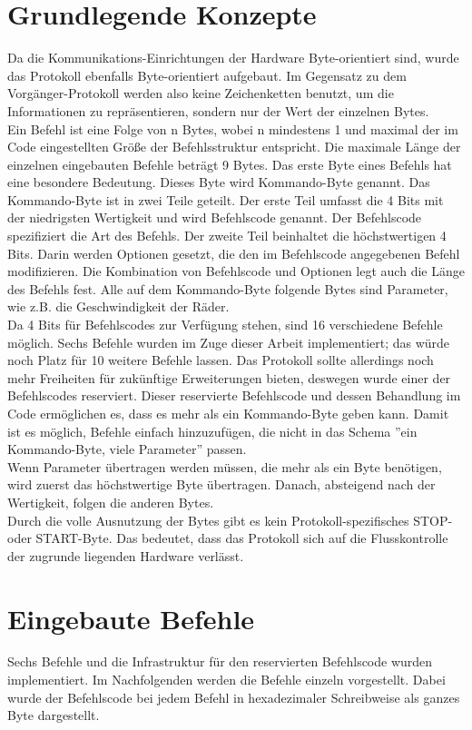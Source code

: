 \section{Grundlegende Konzepte}
Da die Kommunikations-Einrichtungen der Hardware Byte-orientiert sind, wurde das
Protokoll ebenfalls Byte-orientiert aufgebaut. Im Gegensatz zu dem Vorgänger-Protokoll
werden also keine Zeichenketten benutzt, um die Informationen zu repräsentieren, sondern
nur der Wert der einzelnen Bytes.\\
Ein Befehl ist eine Folge von n Bytes, wobei n mindestens 1 und maximal der im Code
eingestellten Größe der Befehlsstruktur entspricht. 
Die maximale Länge der einzelnen eingebauten Befehle beträgt 9 Bytes.
Das erste Byte eines Befehls hat eine
besondere Bedeutung. Dieses Byte wird Kommando-Byte genannt. Das Kommando-Byte
ist in zwei Teile geteilt. Der erste Teil umfasst die 4 Bits mit der niedrigsten Wertigkeit und
wird Befehlscode genannt. Der Befehlscode spezifiziert die Art des Befehls.
Der zweite Teil beinhaltet die höchstwertigen 4 Bits. Darin werden Optionen
gesetzt, die den im Befehlscode angegebenen Befehl modifizieren. Die Kombination
von Befehlscode und Optionen legt auch die Länge des Befehls fest. Alle auf dem
Kommando-Byte folgende Bytes sind Parameter, wie z.B. die Geschwindigkeit der Räder.\\
Da 4 Bits für Befehlscodes zur Verfügung stehen, sind 16 verschiedene Befehle möglich.
Sechs Befehle wurden im Zuge dieser Arbeit implementiert; das würde noch Platz für
10 weitere Befehle lassen. Das Protokoll sollte allerdings noch mehr Freiheiten
für zukünftige Erweiterungen bieten, deswegen wurde einer der Befehlscodes
reserviert. Dieser reservierte Befehlscode und dessen Behandlung im Code ermöglichen
es, dass es mehr als ein Kommando-Byte geben kann. Damit ist es möglich, Befehle einfach 
hinzuzufügen, die nicht in das Schema ''ein Kommando-Byte, viele Parameter'' passen.\\
Wenn Parameter übertragen werden müssen, die mehr als ein Byte benötigen, wird zuerst
das höchstwertige Byte übertragen. Danach, absteigend nach der Wertigkeit, folgen die anderen
Bytes.\\
Durch die volle Ausnutzung der Bytes gibt es kein Protokoll-spezifisches STOP- oder START-Byte.
Das bedeutet, dass das Protokoll sich auf die Flusskontrolle der zugrunde liegenden Hardware
verlässt.

\section{Eingebaute Befehle}
Sechs Befehle und die Infrastruktur für den reservierten Befehlscode wurden implementiert.
Im Nachfolgenden werden die Befehle einzeln vorgestellt. Dabei wurde der Befehlscode bei
jedem Befehl in hexadezimaler Schreibweise als ganzes Byte dargestellt.

